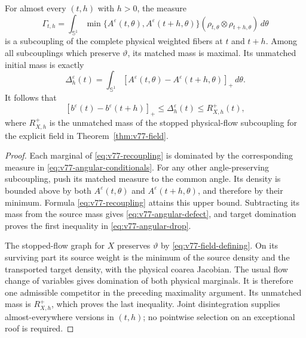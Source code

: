 \begin{theorem}
\label{thm:v77-recoupling}
For almost every $(t,h)$ with $h>0$, the measure
\begin{equation}\label{eq:v77-recoupling}
 \Gamma_{t,h}=\int_{\mathbb S^1}
       \min\{A^\varepsilon(t,\theta),A^\varepsilon(t+h,\theta)\}
          (\rho_{t,\theta}\otimes\rho_{t+h,\theta})\,d\theta
\end{equation}
is a subcoupling of the complete physical weighted fibers at $t$ and
$t+h$. Among all subcouplings which preserve $\vartheta$, its matched
mass is maximal. Its unmatched initial mass is exactly
\begin{equation}\label{eq:v77-angular-defect}
 \Delta_h^\varepsilon(t)=\int_{\mathbb S^1}
          [A^\varepsilon(t,\theta)-A^\varepsilon(t+h,\theta)]_+\,d\theta.
\end{equation}
It follows that
\begin{equation}\label{eq:v77-angular-drop}
 [b^\varepsilon(t)-b^\varepsilon(t+h)]_+
                   \le\Delta_h^\varepsilon(t)\le R^+_{X,h}(t),
\end{equation}
where $R^+_{X,h}$ is the unmatched mass of the stopped physical-flow
subcoupling for the explicit field in Theorem~\ref{thm:v77-field}.
\end{theorem}
\begin{proof}
Each marginal of \eqref{eq:v77-recoupling} is dominated by the
corresponding measure in \eqref{eq:v77-angular-conditionals}.
For any other angle-preserving subcoupling, push its matched measure
to the common angle. Its density is bounded above by both
$A^\varepsilon(t,\theta)$ and $A^\varepsilon(t+h,\theta)$, and
therefore by their minimum. Formula \eqref{eq:v77-recoupling}
attains this upper bound. Subtracting its mass from the source mass
gives \eqref{eq:v77-angular-defect}, and target domination proves
the first inequality in \eqref{eq:v77-angular-drop}.

The stopped-flow graph for $X$ preserves $\vartheta$ by
\eqref{eq:v77-field-defining}. On its surviving part its source
weight is the minimum of the source density and the transported
target density, with the physical coarea Jacobian. The usual flow
change of variables gives domination of both physical marginals.
It is therefore one admissible competitor in the preceding maximality
argument. Its unmatched mass is $R^+_{X,h}$, which proves the last
inequality. Joint disintegration supplies almost-everywhere versions
in $(t,h)$; no pointwise selection on an exceptional roof is required.
\end{proof}


